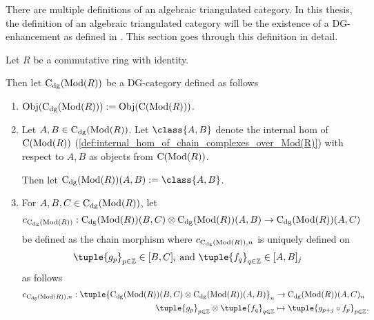 There are multiple definitions of an algebraic triangulated category. In this thesis, the definition of an algebraic triangulated category will be the existence of a DG-enhancement as defined in \cite[Definition 3.1.3]{Jasso-Muro_2023}. This section goes through this definition in detail.

\begin{definition}[\( \C_{\dg}(\Mod(R)) \)]
    \label{def:c_dg_mod_r}
    Let \( R \) be a commutative ring with identity.

    Then let \emph{\( \C_{\dg}(\Mod(R)) \)} be a DG-category defined as follows
    \begin{enumerate}
        \item {
            \( \operatorname{Obj}(\operatorname{C}_{\operatorname{dg}}(\operatorname{Mod}(R))) := \operatorname{Obj}(\operatorname{C}(\operatorname{Mod}(R))) \).
        }
        \item {
            Let \( A, B \in \operatorname{C}_{\operatorname{dg}}(\operatorname{Mod}(R)) \). Let \( \class{A, B} \) denote the internal hom of \( \operatorname{C}(\operatorname{Mod}(R)) \) (\autoref{def:internal_hom_of_chain_complexes_over_Mod(R)}) with respect to \( A, B \) as objects from \( \operatorname{C}(\operatorname{Mod}(R)) \).

            Then let \( \C_{\dg}(\Mod(R))(A, B) := \class{A, B} \).
        }
        \item {
            For \( A, B, C \in \operatorname{C}_{\operatorname{dg}}(\operatorname{Mod}(R)) \), let
            \[
                c_{\operatorname{C}_{\operatorname{dg}}(\operatorname{Mod}(R))}: \operatorname{C}_{\operatorname{dg}}(\operatorname{Mod}(R))(B, C) \otimes \operatorname{C}_{\operatorname{dg}}(\operatorname{Mod}(R))(A, B) \to \operatorname{C}_{\operatorname{dg}}(\operatorname{Mod}(R))(A, C)
            \]
            be defined as the chain morphism where \( c_{\operatorname{C}_{\operatorname{dg}}(\operatorname{Mod}(R)), n} \) is uniquely defined on
            \[
                \tuple{g_p}_{p \in \Zb} \in [B, C]_i \text{ and } \tuple{f_q}_{q \in \Zb} \in [A, B]_j
            \]
            as follows
            \begin{align*}
                c_{\C_{\dg}(\Mod(R)), n}: \tuple{ \C_{\dg}(\Mod(R))(B, C) \otimes \C_{\dg}(\Mod(R))(A, B) }_n &\to \C_{\dg}(\Mod(R))(A, C)_n \\
                \tuple{g_p}_{p \in \Zb} \otimes \tuple{f_q}_{q \in \Zb} &\mapsto \tuple{g_{p + j} \circ f_p}_{p \in \Zb}.
            \end{align*}
        }
    \end{enumerate}
\end{definition}

